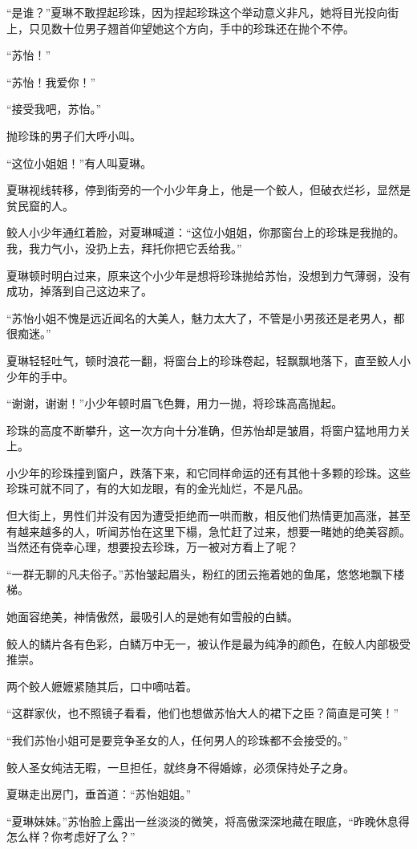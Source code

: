 \begin{this_body}
“是谁？”夏琳不敢捏起珍珠，因为捏起珍珠这个举动意义非凡，她将目光投向街上，只见数十位男子翘首仰望她这个方向，手中的珍珠还在抛个不停。

“苏怡！”

“苏怡！我爱你！”

“接受我吧，苏怡。”

抛珍珠的男子们大呼小叫。

“这位小姐姐！”有人叫夏琳。

夏琳视线转移，停到街旁的一个小少年身上，他是一个鲛人，但破衣烂衫，显然是贫民窟的人。

鲛人小少年通红着脸，对夏琳喊道：“这位小姐姐，你那窗台上的珍珠是我抛的。我，我力气小，没扔上去，拜托你把它丢给我。”

夏琳顿时明白过来，原来这个小少年是想将珍珠抛给苏怡，没想到力气薄弱，没有成功，掉落到自己这边来了。

“苏怡小姐不愧是远近闻名的大美人，魅力太大了，不管是小男孩还是老男人，都很痴迷。”

夏琳轻轻吐气，顿时浪花一翻，将窗台上的珍珠卷起，轻飘飘地落下，直至鲛人小少年的手中。

“谢谢，谢谢！”小少年顿时眉飞色舞，用力一抛，将珍珠高高抛起。

珍珠的高度不断攀升，这一次方向十分准确，但苏怡却是皱眉，将窗户猛地用力关上。

小少年的珍珠撞到窗户，跌落下来，和它同样命运的还有其他十多颗的珍珠。这些珍珠可就不同了，有的大如龙眼，有的金光灿烂，不是凡品。

但大街上，男性们并没有因为遭受拒绝而一哄而散，相反他们热情更加高涨，甚至有越来越多的人，听闻苏怡在这里下榻，急忙赶了过来，想要一睹她的绝美容颜。当然还有侥幸心理，想要投去珍珠，万一被对方看上了呢？

“一群无聊的凡夫俗子。”苏怡皱起眉头，粉红的团云拖着她的鱼尾，悠悠地飘下楼梯。

她面容绝美，神情傲然，最吸引人的是她有如雪般的白鳞。

鲛人的鳞片各有色彩，白鳞万中无一，被认作是最为纯净的颜色，在鲛人内部极受推崇。

两个鲛人嬷嬷紧随其后，口中嘀咕着。

“这群家伙，也不照镜子看看，他们也想做苏怡大人的裙下之臣？简直是可笑！”

“我们苏怡小姐可是要竞争圣女的人，任何男人的珍珠都不会接受的。”

鲛人圣女纯洁无暇，一旦担任，就终身不得婚嫁，必须保持处子之身。

夏琳走出房门，垂首道：“苏怡姐姐。”

“夏琳妹妹。”苏怡脸上露出一丝淡淡的微笑，将高傲深深地藏在眼底，“昨晚休息得怎么样？你考虑好了么？”


\end{this_body}
